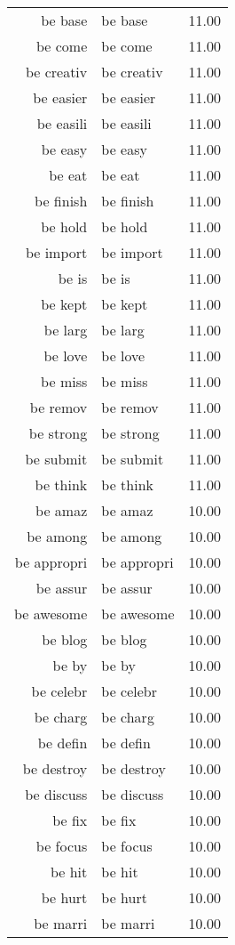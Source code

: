 \begin{table}[ht]
\begin{tabular}{rlr}
  be base & be base & 11.00 \\ 
  be come & be come & 11.00 \\ 
  be creativ & be creativ & 11.00 \\ 
  be easier & be easier & 11.00 \\ 
  be easili & be easili & 11.00 \\ 
  be easy & be easy & 11.00 \\ 
  be eat & be eat & 11.00 \\ 
  be finish & be finish & 11.00 \\ 
  be hold & be hold & 11.00 \\ 
  be import & be import & 11.00 \\ 
  be is & be is & 11.00 \\ 
  be kept & be kept & 11.00 \\ 
  be larg & be larg & 11.00 \\ 
  be love & be love & 11.00 \\ 
  be miss & be miss & 11.00 \\ 
  be remov & be remov & 11.00 \\ 
  be strong & be strong & 11.00 \\ 
  be submit & be submit & 11.00 \\ 
  be think & be think & 11.00 \\ 
  be amaz & be amaz & 10.00 \\ 
  be among & be among & 10.00 \\ 
  be appropri & be appropri & 10.00 \\ 
  be assur & be assur & 10.00 \\ 
  be awesome & be awesome & 10.00 \\ 
  be blog & be blog & 10.00 \\ 
  be by & be by & 10.00 \\ 
  be celebr & be celebr & 10.00 \\ 
  be charg & be charg & 10.00 \\ 
  be defin & be defin & 10.00 \\ 
  be destroy & be destroy & 10.00 \\ 
  be discuss & be discuss & 10.00 \\ 
  be fix & be fix & 10.00 \\ 
  be focus & be focus & 10.00 \\ 
  be hit & be hit & 10.00 \\ 
  be hurt & be hurt & 10.00 \\ 
  be marri & be marri & 10.00 \\ 

\end{tabular}
\end{table}
